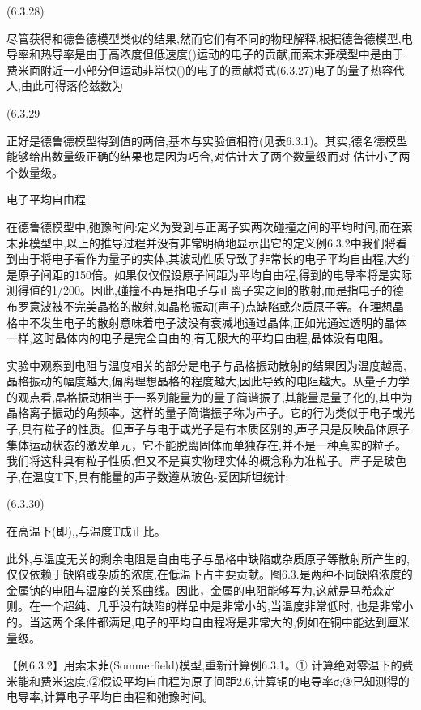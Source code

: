  	(6.3.28)

尽管获得和德鲁德模型类似的结果,然而它们有不同的物理解释,根据德鲁德模型,电导率和热导率是由于高浓度但低速度()运动的电子的贡献,而索末菲模型中是由于费米面附近一小部分但运动非常快()的电子的贡献将式(6.3.27)电子的量子热容代人,由此可得落伦兹数为

 	(6.3.29

正好是德鲁德模型得到值的两倍,基本与实验值相符(见表6.3.1)。其实,德名德模型能够给出数量级正确的结果也是因为巧合,对估计大了两个数量级而对 估计小了两个数量级。

电子平均自由程

在德鲁德模型中,弛豫时间:定义为受到与正离子实两次碰撞之间的平均时间,而在索末菲模型中,以上的推导过程并没有非常明确地显示出它的定义例6.3.2中我们将看到由于将电子看作为量子的实体,其波动性质导致了非常长的电子平均自由程,大约是原子间距的150倍。如果仅仅假设原子间距为平均自由程,得到的电导率将是实际测得值的1/200。因此,碰撞不再是指电子与正离子实之间的散射,而是指电子的德布罗意波被不完美晶格的散射,如晶格振动(声子)点缺陷或杂质原子等。在理想晶格中不发生电子的散射意味着电子波没有衰减地通过晶体,正如光通过透明的晶体一样,这时晶体内的电子是完全自由的,有无限大的平均自由程,晶体没有电阻。

实验中观察到电阻与温度相关的部分是电子与品格振动散射的结果因为温度越高,晶格振动的幅度越大,偏离理想晶格的程度越大,因此导致的电阻越大。从量子力学的观点看,晶格振动相当于一系列能量为的量子简谐振子,其能量是量子化的,其中为晶格离子振动的角频率。这样的量子简谐振子称为声子。它的行为类似于电子或光子,具有粒子的性质。但声子与电于或光子是有本质区别的,声子只是反映晶体原子集体运动状态的激发单元，它不能脱离固体而单独存在,并不是一种真实的粒子。我们将这种具有粒子性质,但又不是真实物理实体的概念称为准粒子。声子是玻色子,在温度T下,具有能量的声子数遵从玻色-爱因斯坦统计:

 	(6.3.30)

在高温下(即),,与温度T成正比。

此外,与温度无关的剩余电阻是自由电子与晶格中缺陷或杂质原子等散射所产生的,仅仅依赖于缺陷或杂质的浓度,在低温下占主要贡献。图6.3.是两种不同缺陷浓度的金属钠的电阻与温度的关系曲线。因此，金属的电阻能够写为,这就是马希森定则。在一个超纯、几乎没有缺陷的样品中是非常小的,当温度非常低时, 也是非常小的。当这两个条件都满足,电子的平均自由程将是非常大的,例如在铜中能达到厘米量级。



【例6.3.2】用索末菲(Sommerfield)模型,重新计算例6.3.1。① 计算绝对零温下的费米能和费米速度;②假设平均自由程为原子间距2.6,计算铜的电导率σ;③已知测得的电导率,计算电子平均自由程和弛豫时间。

